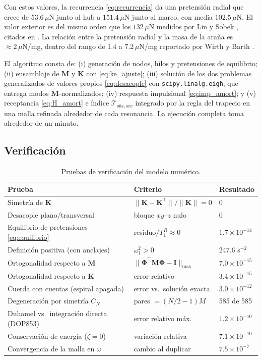\documentclass[11pt,letterpaper]{article}
\newcommand{\uN}{\,\mu\mathrm{N}}
\begin{document}
Con estos valores, la recurrencia \eqref{eq:recurrencia} da una pretensión
radial que crece de $53.6\uN$ junto al hub a $151.4\uN$ junto al marco, con
media $102.5\uN$. El valor exterior es del mismo orden que los $132\uN$
medidos por Lin y Sobek \cite{linsobek1998}, citados en \cite{yavuz2024}.
La relación entre la pretensión radial y la masa de la araña es
$\approx 2\uN$/mg, dentro del rango de 1.4 a $7.2\uN$/mg reportado por
Wirth y Barth \cite{wirth1992}.

El algoritmo consta de: (i) generación de nodos, hilos y pretensiones de
equilibrio; (ii) ensamblaje de $\mathbf{M}$ y $\mathbf{K}$ con
\eqref{eq:ke_ajuste}; (iii) solución de los dos problemas generalizados de
valores propios \eqref{eq:desacople} con \texttt{scipy.linalg.eigh}, que
entrega modos $\mathbf{M}$-normalizados; (iv) respuesta impulsional
\eqref{eq:imp_amort}; y (v) receptancia \eqref{eq:H_amort} e índice
$\mathcal{T}_{obs,src}$ integrado por la regla del trapecio en una malla
refinada alrededor de cada resonancia. La ejecución completa toma alrededor
de un minuto.

\subsection{Verificación}

\begin{table}[H]
\centering\small
\caption{Pruebas de verificación del modelo numérico.}
\label{tab:verif}
\begin{tabular}{@{}p{7.2cm}p{4.6cm}l@{}}
\toprule
Prueba & Criterio & Resultado \\
\midrule
Simetría de $\mathbf{K}$ & $\|\mathbf{K}-\mathbf{K}^\top\|/\|\mathbf{K}\|=0$ & $0$ \\
Desacople plano/transversal & bloque $xy$--$z$ nulo & $0$ \\
Equilibrio de pretensiones \eqref{eq:equilibrio} & residuo$/T^R_1\approx0$ & $1.7\times10^{-14}$ \\
Definición positiva (con anclajes) & $\omega_1^2>0$ & $247.6$ s$^{-2}$ \\
Ortogonalidad respecto a $\mathbf{M}$ & $\|\boldsymbol{\Phi}^\top\mathbf{M}\boldsymbol{\Phi}-\mathbf{I}\|_{\max}$ & $7.0\times10^{-15}$ \\
Ortogonalidad respecto a $\mathbf{K}$ & error relativo & $3.4\times10^{-15}$ \\
Cuerda con cuentas (espiral apagada) & error vs.\ solución exacta & $3.0\times10^{-12}$ \\
Degeneración por simetría $C_N$ & pares $=(N/2-1)M$ & 585 de 585 \\
Duhamel vs.\ integración directa (DOP853) & error relativo máx. & $1.2\times10^{-10}$ \\
Conservación de energía ($\zeta=0$) & variación relativa & $7.1\times10^{-10}$ \\
Convergencia de la malla en $\omega$ & cambio al duplicar & $7.5\times10^{-7}$ \\
\bottomrule
\end{tabular}
\end{table}
\end{document}
